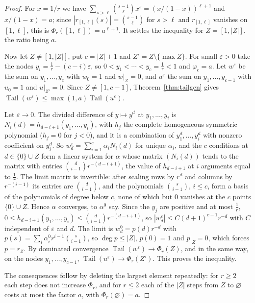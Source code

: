 \documentclass[11pt]{article}
\DeclareMathOperator{\Tail}{Tail}
\begin{document}
\begin{proof}
For $x=1/r$ we have $\sum_{s>\ell}\binom{s-1}\ell x^s=(x/(1-x))^{\ell+1}$
and $x/(1-x)=a$; since $|r_{[1,\ell]}(s)|=\binom{s-1}\ell$ for $s>\ell$ and
$r_{[1,\ell]}$ vanishes on $[1,\ell]$, this is $\Phi_r([1,\ell])=a^{\ell+1}$.
It settles the inequality for $Z=[1,|Z|]$, the ratio being $a$.

Now let $Z\ne[1,|Z|]$, put $c=|Z|+1$ and $Z'=Z\setminus\{\max Z\}$.  For
small $\varepsilon>0$ take the nodes $y_i=\frac1r-(c-i)\varepsilon$, so
$0<y_1<\cdots<y_c=\frac1r<1$ and $\varphi_c=a$.  Let $w^\varepsilon$ be the
sum on $y_1,\ldots,y_c$ with $w_0=1$ and $w|_Z=0$, and $u^\varepsilon$ the
sum on $y_1,\ldots,y_{c-1}$ with $u_0=1$ and $u|_{Z'}=0$.  Since
$Z\ne[1,c-1]$, Theorem~\ref{thm:tailgen} gives
$\Tail(w^\varepsilon)\le\max(1,a)\Tail(u^\varepsilon)$.

Let $\varepsilon\to0$.  The divided difference of $y\mapsto y^d$ at
$y_1,\ldots,y_i$ is $N_i(d)=h_{d-i+1}(y_1,\ldots,y_i)$, with $h_j$ the
complete homogeneous symmetric polynomial ($h_j=0$ for $j<0$), and it is a
combination of $y_1^d,\ldots,y_i^d$ with nonzero coefficient on $y_i^d$.  So
$w^\varepsilon_d=\sum_{i=1}^c\alpha_iN_i(d)$ for unique $\alpha_i$, and the
$c$ conditions at $d\in\{0\}\cup Z$ form a linear system for $\alpha$ whose
matrix $(N_i(d))$ tends to the matrix with entries
$\binom d{i-1}r^{-(d-i+1)}$, the value of $h_{d-i+1}$ at $i$ arguments equal
to $\frac1r$.  The limit matrix is invertible: after scaling rows by $r^d$
and columns by $r^{-(i-1)}$ its entries are $\binom d{i-1}$, and the
polynomials $\binom s{i-1}$, $i\le c$, form a basis of the polynomials of
degree below $c$, none of which but $0$ vanishes at the $c$ points
$\{0\}\cup Z$.  Hence $\alpha$ converges, to $\alpha^0$ say.  Since the $y_j$
are positive and at most $\frac1r$,
$0\le h_{d-i+1}(y_1,\ldots,y_i)\le\binom d{i-1}r^{-(d-i+1)}$, so
$|w^\varepsilon_d|\le C(d+1)^{c-1}r^{-d}$ with $C$ independent of
$\varepsilon$ and $d$.  The limit is $w^0_d=p(d)r^{-d}$ with
$p(s)=\sum_i\alpha^0_ir^{i-1}\binom s{i-1}$, so $\deg p\le|Z|$, $p(0)=1$
and $p|_Z=0$, which forces $p=r_Z$.  By dominated convergence
$\Tail(w^\varepsilon)\to\Phi_r(Z)$, and in the same way, on the nodes
$y_1,\ldots,y_{c-1}$, $\Tail(u^\varepsilon)\to\Phi_r(Z')$.  This proves the
inequality.

The consequences follow by deleting the largest element repeatedly: for
$r\ge2$ each step does not increase $\Phi_r$, and for $r\le2$ each of the
$|Z|$ steps from $Z$ to $\varnothing$ costs at most the factor $a$, with
$\Phi_r(\varnothing)=a$.
\end{proof}
\end{document}
